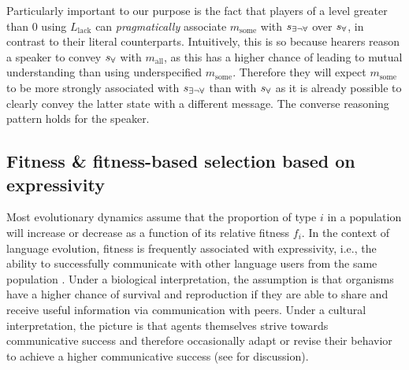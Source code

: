 \documentclass[a4paper]{article}
\newcommand{\state}{\ensuremath{s}\xspace}		%
\newcommand{\mystate}[1]{\ensuremath{\state_{\text{#1}}}\xspace} %
\newcommand{\mylang}[1]{\ensuremath{L_{\text{#1}}}\xspace} %
\newcommand{\messg}{\ensuremath{m}\xspace}		%
\newcommand{\mymessg}[1]{\ensuremath{\messg_{\text{#1}}}\xspace} %
\newcommand{\ssome}{\mystate{\ensuremath{\exists\neg\forall}}}
\newcommand{\sall}{\mystate{\ensuremath{\forall}}}
\newcommand{\msome}{\mymessg{some}}
\newcommand{\mall}{\mymessg{all}}
\newcommand{\Llack}{\mylang{lack}}
\begin{document}
Particularly important to our purpose is the fact that players of a level greater than $0$ using $\Llack$ can {\em pragmatically} associate $\msome$ with $\ssome$ over $\sall$, in contrast to their literal counterparts. Intuitively, this is so because hearers reason a speaker to convey $\sall$ with $\mall$, as this has a higher chance of leading to mutual understanding than using underspecified $\msome$. Therefore they will expect $\msome$ to be more strongly associated with $\ssome$ than with $\sall$ as it is already possible to clearly convey the latter state with a different message. The converse reasoning pattern holds for the speaker.

\subsection{Fitness \& fitness-based selection based on expressivity}\label{sec:expressivity}

Most evolutionary dynamics assume that the proportion of type $i$ in a population will increase
or decrease as a function of its relative fitness $f_i$. In the context of language evolution,
fitness is frequently associated with expressivity, i.e., the ability to successfully
communicate with other language users from the same population
\citep[e.g.,][]{nowak+krakauer:1999,nowak+etal:2000, nowak+etal:2002}. Under a biological
interpretation, the assumption is that organisms have a higher chance of survival and
reproduction if they are able to share and receive useful information via communication with
peers. Under a cultural interpretation, the picture is that agents themselves strive towards
communicative success and therefore occasionally adapt or revise their behavior to achieve a
higher communicative success (see \citealt[\S3.3]{benz+etal:2005b} for discussion).
\end{document}
